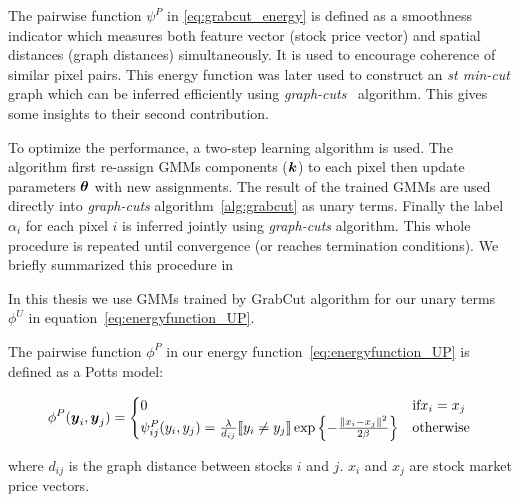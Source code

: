 The pairwise function $\psi^P$ in \eqref{eq:grabcut_energy} is
defined as a smoothness indicator which measures both feature
vector (stock price vector) and spatial distances (graph
distances) simultaneously. It is used to encourage coherence of
similar pixel pairs. This energy function was later used to
construct an \emph{st min-cut} graph which can be inferred
efficiently using \emph{graph-cuts}~\cite{Boykov:ICCV01}
algorithm. This gives some insights to their second contribution.

To optimize the performance, a two-step learning algorithm is
used. The algorithm first re-assign GMMs components (${\boldsymbol{k}}$) to
each pixel then update parameters $\boldsymbol{\theta}$ with new assignments.
The result of the trained GMMs are used directly into
\emph{graph-cuts} algorithm~\ref{alg:grabcut} as unary terms.
Finally the label $\alpha_i$ for each pixel $i$ is inferred
jointly using \emph{graph-cuts} algorithm. This whole procedure
is repeated until convergence (or reaches termination
conditions). We briefly summarized this procedure in

In this thesis we use GMMs trained by GrabCut algorithm for our
unary terms $\phi^U$ in equation~\eqref{eq:energyfunction_UP}.

The pairwise function $\phi^P$ in our energy
function~\eqref{eq:energyfunction_UP} is defined as a Potts
model:

\begin{align}
  \label{eq:energyfunction_pairwise}
  \phi^P(\by_i,\by_j)=
  \begin{cases}
    0 & \text{if} x_i = x_j \\
    \psi^P_{ij}(y_i, y_j) = \frac{\lambda}{d_{ij}} \ind{y_i \neq
      y_j} \exp\left\{- \frac{\|x_i - x_j\|^2}{2 \beta}\right\} &
    \text{otherwise}
  \end{cases}
\end{align}

\noindent where $d_{ij}$ is the graph distance between stocks $i$
and $j$. $x_i$ and $x_j$ are stock market price vectors.


